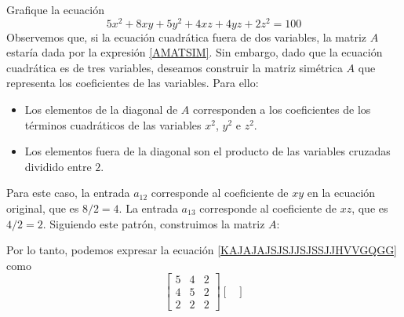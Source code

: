 \begin{example}\label{Example:forcuatvaria}
    Grafique la ecuación
    \begin{equation}
        5x^2 + 8xy + 5y^2 + 4xz + 4yz + 2z^2 = 100 \label{KAJAJAJSJSJJSJSSJJHVVGQGG}
    \end{equation}
    \solucion Observemos que, si la ecuación cuadrática fuera de dos variables, la matriz $A$ estaría dada por la expresión \eqref{AMATSIM}. Sin embargo, dado que la ecuación cuadrática es de tres variables, deseamos construir la matriz simétrica $A$ que representa los coeficientes de las variables. Para ello:
    \begin{itemize}
        \item Los elementos de la diagonal de $A$ corresponden a los coeficientes de los términos cuadráticos de las variables $x^2$, $y^2$ e $z^2$.
        \item Los elementos fuera de la diagonal son el producto de las variables cruzadas dividido entre $2$.
    \end{itemize}
    Para este caso, la entrada $a_{12}$ corresponde al coeficiente de $xy$ en la ecuación original, que es $8/2 = 4$. La entrada $a_{13}$ corresponde al coeficiente de $xz$, que es $4/2 = 2$. Siguiendo este patrón, construimos la matriz $A$:
    \begin{nscenter}
    \end{nscenter}
    Por lo tanto, podemos expresar la ecuación \eqref{KAJAJAJSJSJJSJSSJJHVVGQGG} como
    $$\begin{bmatrix}
        5 & 4 & 2 \\
        4 & 5 & 2 \\
        2 & 2 & 2
    \end{bmatrix} \begin{bmatrix}

\end{bmatrix}$$
\end{example}
